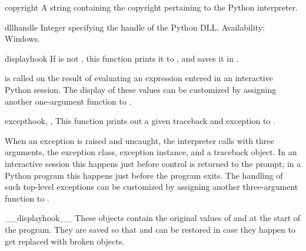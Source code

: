 \begin{datadesc}{copyright}
  A string containing the copyright pertaining to the Python
  interpreter.
\end{datadesc}

\begin{datadesc}{dllhandle}
  Integer specifying the handle of the Python DLL.
  Availability: Windows.
\end{datadesc}

\begin{funcdesc}{displayhook}{}
  If  is not , this function prints it to
  , and saves it in .

   is called on the result of evaluating an
  expression entered in an interactive Python session.  The display of
  these values can be customized by assigning another one-argument
  function to .
\end{funcdesc}

\begin{funcdesc}{excepthook}{, , }
  This function prints out a given traceback and exception to
  .

  When an exception is raised and uncaught, the interpreter calls
   with three arguments, the exception class,
  exception instance, and a traceback object.  In an interactive
  session this happens just before control is returned to the prompt;
  in a Python program this happens just before the program exits.  The
  handling of such top-level exceptions can be customized by assigning
  another three-argument function to .
\end{funcdesc}

\begin{datadesc}{__displayhook__}
  These objects contain the original values of  and
   at the start of the program.  They are saved so
  that  and  can be restored in
  case they happen to get replaced with broken objects.
\end{datadesc}

